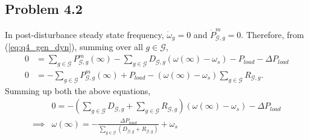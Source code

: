 \subsection*{Problem 4.2}
In post-disturbance steady state frequency, $\dot{\omega}_g = 0$ and $\dot{P}_{\mathcal{G},g}^m = 0$. Therefore, from (\ref{eq:q4_gen_dyn}), summing over all $g \in \mathcal{G}$,
\begin{align}
	0 &= \sum_{g\in \mathcal{G}} P_{\mathcal{G},g}^m(\infty) - \sum_{g\in \mathcal{G}}D_{\mathcal{G},g}(\omega(\infty)-\omega_s) - P_{load}-\Delta P_{load}\\
	0 &= -\sum_{g\in \mathcal{G}} P_{\mathcal{G},g}^m(\infty) + P_{load} - (\omega(\infty)-\omega_s)\sum_{g\in \mathcal{G}}R_{\mathcal{G},g}.
\end{align}
Summing up both the above equations,
\begin{align*}
	&0 = -(\sum_{g\in \mathcal{G}}D_{\mathcal{G},g} + \sum_{g\in \mathcal{G}}R_{\mathcal{G},g})(\omega(\infty)-\omega_s)-\Delta P_{load}\\
	\implies & \omega(\infty) = -\frac{\Delta P_{load}}{\sum_{g\in \mathcal{G}} (D_{\mathcal{G},g}+R_{\mathcal{G},g})}+\omega_s
\end{align*}
